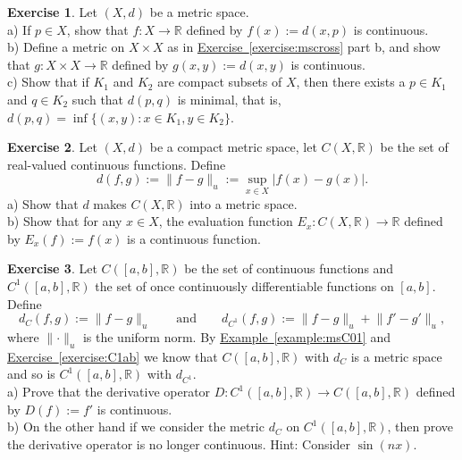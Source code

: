 \documentclass[12pt]{book}
\newcommand{\snorm}[1]{\lVert {#1} \rVert}
\newcommand{\abs}[1]{\left\lvert {#1} \right\rvert}
\newcommand{\R}{{\mathbb{R}}}
\theoremstyle{plain}
\theoremstyle{remark}
\theoremstyle{definition}
\theoremstyle{exercise}
\newtheorem{exercise}{Exercise}[section]
\theoremstyle{example}
\newcommand{\exerciseref}[1]{\hyperref[#1]{Exercise~\ref*{#1}}}
\newcommand{\exampleref}[1]{\hyperref[#1]{Example~\ref*{#1}}}
\begin{document}
\begin{exercise}
Let $(X,d)$ be a metric space.\\
a) If $p \in X$,
show that $f \colon X \to \R$ defined
by $f(x) := d(x,p)$ is continuous.
\\
b) Define a metric on $X \times X$ as in \exerciseref{exercise:mscross} part
b, and show that $g \colon X \times X \to \R$ defined by
$g(x,y) := d(x,y)$ is continuous.
\\
c) Show that if $K_1$ and $K_2$ are compact subsets of $X$, then
there exists a $p \in K_1$ and $q \in K_2$ such that $d(p,q)$ is minimal,
that is, $d(p,q) = \inf \{ (x,y) \colon x \in K_1, y \in K_2 \}$.
\end{exercise}

\begin{exercise}
Let $(X,d)$ be a compact metric space, let $C(X,\R)$ be the set
of real-valued continuous functions.  Define
\begin{equation*}
d(f,g) := \snorm{f-g}_u := \sup_{x \in X} \abs{f(x)-g(x)} .
\end{equation*}
a) Show that $d$ makes $C(X,\R)$ into a metric space.\\
b) Show that for any $x \in X$, the evaluation function
$E_x \colon C(X,\R) \to \R$ defined by $E_x(f) := f(x)$
is a continuous function.
\end{exercise}

\begin{exercise}
Let $C([a,b],\R)$ be the set of continuous functions and
$C^1([a,b],\R)$ the set of once continuously differentiable
functions on $[a,b]$.
Define
\begin{equation*}
d_{C}(f,g) := \snorm{f-g}_u
\qquad \text{and} \qquad
d_{C^1}(f,g) := \snorm{f-g}_u + \snorm{f'-g'}_u,
\end{equation*}
where $\snorm{\cdot}_u$ is the uniform norm.
By \exampleref{example:msC01} and \exerciseref{exercise:C1ab} we know that
$C([a,b],\R)$ with $d_C$ is a metric space and
so is
$C^1([a,b],\R)$ with $d_{C^1}$.\\
a) Prove that the derivative operator $D \colon 
C^1([a,b],\R) \to C([a,b],\R)$ defined by
$D(f) := f'$ is continuous.
\\
b) On the other hand if we consider the metric $d_C$ on $C^1([a,b],\R)$,
then prove the derivative operator is no longer continuous.  Hint: Consider
$\sin(n x)$.
\end{exercise}

\end{document}
